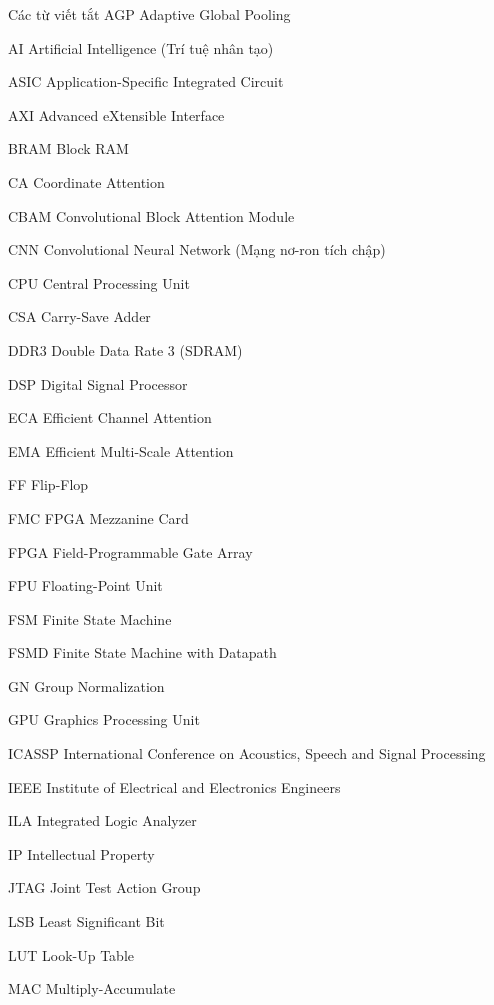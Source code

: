 \documentclass{uetgraduation}
\begin{document}
\begin{contentlisting}

\tableofcontents
\listoffigures
\listoftables

\begin{contentlistingsection}{Các từ viết tắt}
AGP \quad Adaptive Global Pooling

AI \quad Artificial Intelligence (Trí tuệ nhân tạo)

ASIC \quad Application-Specific Integrated Circuit

AXI \quad Advanced eXtensible Interface

BRAM \quad Block RAM

CA \quad Coordinate Attention

CBAM \quad Convolutional Block Attention Module

CNN \quad Convolutional Neural Network (Mạng nơ-ron tích chập)

CPU \quad Central Processing Unit

CSA \quad Carry-Save Adder

DDR3 \quad Double Data Rate 3 (SDRAM)

DSP \quad Digital Signal Processor

ECA \quad Efficient Channel Attention

EMA \quad Efficient Multi-Scale Attention

FF \quad Flip-Flop

FMC \quad FPGA Mezzanine Card

FPGA \quad Field-Programmable Gate Array

FPU \quad Floating-Point Unit

FSM \quad Finite State Machine

FSMD \quad Finite State Machine with Datapath

GN \quad Group Normalization

GPU \quad Graphics Processing Unit

ICASSP \quad International Conference on Acoustics, Speech and Signal Processing

IEEE \quad Institute of Electrical and Electronics Engineers

ILA \quad Integrated Logic Analyzer

IP \quad Intellectual Property

JTAG \quad Joint Test Action Group

LSB \quad Least Significant Bit

LUT \quad Look-Up Table

MAC \quad Multiply-Accumulate


\end{contentlistingsection}
\end{contentlisting}
\end{document}
